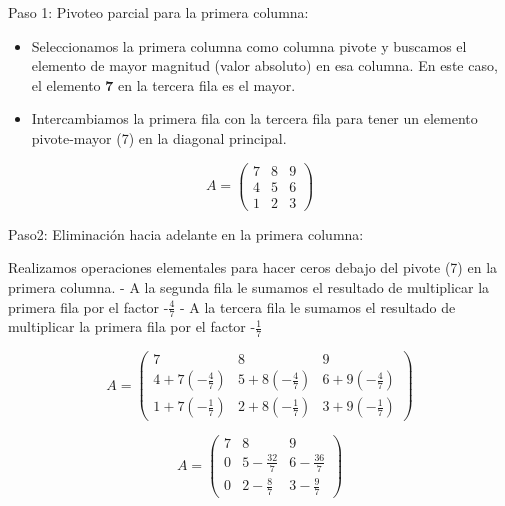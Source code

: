 \documentclass[11pt]{article}
\providecommand{\tightlist}{%
      \setlength{\itemsep}{0pt}\setlength{\parskip}{0pt}}
\begin{document}
    Paso 1: Pivoteo parcial para la primera columna:

    \begin{itemize}
\tightlist
\item
  Seleccionamos la primera columna como columna pivote y buscamos el
  elemento de mayor magnitud (valor absoluto) en esa columna. En este
  caso, el elemento \textbf{7} en la tercera fila es el mayor.
\item
  Intercambiamos la primera fila con la tercera fila para tener un
  elemento pivote-mayor (7) en la diagonal principal.
\end{itemize}

    \begin{equation}
A =
    \begin{pmatrix}
        7 & 8 & 9\\
        4 & 5 & 6\\
        1 & 2 & 3
    \end{pmatrix}
\end{equation}

    Paso2: Eliminación hacia adelante en la primera columna:

    Realizamos operaciones elementales para hacer ceros debajo del pivote
(7) en la primera columna. - A la segunda fila le sumamos el resultado
de multiplicar la primera fila por el factor -\(\frac{4}{7}\) - A la
tercera fila le sumamos el resultado de multiplicar la primera fila por
el factor -\(\frac{1}{7}\)

    \begin{equation}
A =
    \begin{pmatrix}
        7 & 8 & 9\\
        4+7\left (-\frac{4}{7}\right)& 5+8\left (-\frac{4}{7}\right) & 6+9\left (-\frac{4}{7}\right)\\
        1+7\left (-\frac{1}{7}\right) & 2+8\left (-\frac{1}{7}\right) & 3+9\left (-\frac{1}{7}\right)
    \end{pmatrix}
\end{equation}

    \begin{equation}
A =
    \begin{pmatrix}
        7 & 8 & 9\\
        0 & 5 -\frac{32}{7} & 6 -\frac{36}{7}\\
        0 & 2 -\frac{8}{7} & 3 -\frac{9}{7}
    \end{pmatrix}
\end{equation}
\end{document}
